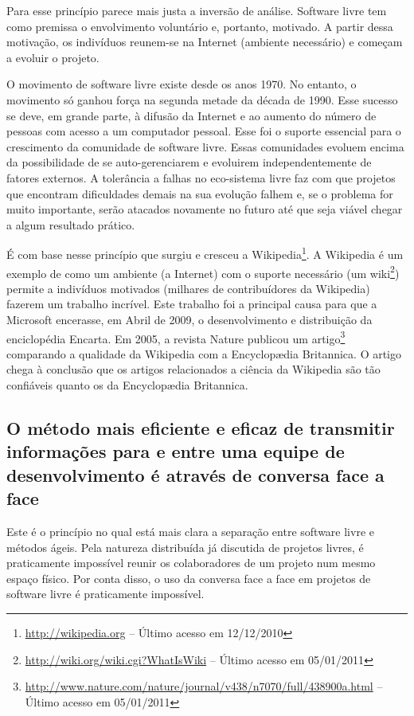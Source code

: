 Para esse princípio parece mais justa a inversão de análise. Software
livre tem como premissa o envolvimento voluntário e, portanto,
motivado. A partir dessa motivação, os indivíduos reunem-se na
Internet (ambiente necessário) e começam a evoluir o projeto.

O movimento de software livre existe desde os anos 1970. No entanto, o
movimento só ganhou força na segunda metade da década de 1990. Esse
sucesso se deve, em grande parte, à difusão da Internet e ao aumento
do número de pessoas com acesso a um computador pessoal. Esse foi o
suporte essencial para o crescimento da comunidade de software
livre. Essas comunidades evoluem encima da possibilidade de se
auto-gerenciarem e evoluirem independentemente de fatores externos. A
tolerância a falhas no eco-sistema livre faz com que projetos que
encontram dificuldades demais na sua evolução falhem e, se o problema
for muito importante, serão atacados novamente no futuro até que seja
viável chegar a algum resultado prático.

É com base nesse princípio que surgiu e cresceu a
Wikipedia\footnote{\url{http://wikipedia.org} -- Último acesso em
  12/12/2010}. A Wikipedia é um exemplo de como um ambiente (a
Internet) com o suporte necessário (um
wiki\footnote{\url{http://wiki.org/wiki.cgi?WhatIsWiki} -- Último acesso em
  05/01/2011}) permite a indivíduos motivados (milhares de
contribuídores da Wikipedia) fazerem um trabalho incrível. Este
trabalho foi a principal causa para que a Microsoft encerasse, em
Abril de 2009, o desenvolvimento e distribuição da enciclopédia
Encarta. Em 2005, a revista Nature publicou um
artigo\footnote{\url{http://www.nature.com/nature/journal/v438/n7070/full/438900a.html}
  -- Último acesso em 05/01/2011} comparando a qualidade da Wikipedia
com a Encyclop{\ae}dia Britannica. O artigo chega à conclusão que os
artigos relacionados a ciência da Wikipedia são tão confiáveis quanto
os da Encyclop{\ae}dia Britannica.

\subsection[Conversa face a face]{O método mais eficiente e eficaz de
  transmitir informações para e entre uma equipe de desenvolvimento é
  através de conversa face a face}

Este é o princípio no qual está mais clara a separação entre software
livre e métodos ágeis. Pela natureza distribuída já discutida de
projetos livres, é praticamente impossível reunir os colaboradores de
um projeto num mesmo espaço físico. Por conta disso, o uso da conversa
face a face em projetos de software livre é praticamente impossível.

